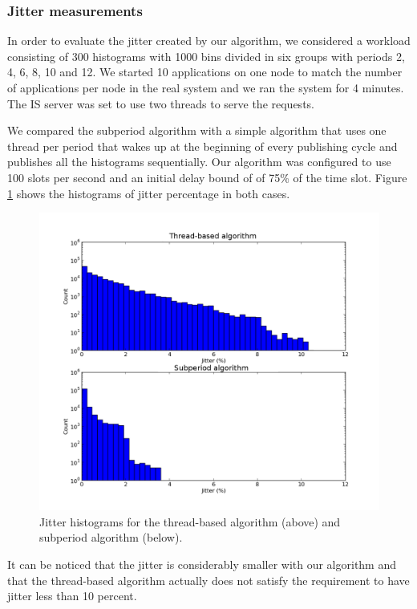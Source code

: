 \subsubsection*{Jitter measurements}

In order to evaluate the jitter created by our algorithm, we considered a workload consisting of 300 histograms with 1000 bins divided in six groups with periods 2, 4, 6, 8, 10 and 12. We started 10 applications on one node to match the number of applications per node in the real system and we ran the system for 4 minutes. The IS server was set to use two threads to serve the requests.

We compared the subperiod algorithm with a simple algorithm that uses one thread per period that wakes up at the beginning of every publishing cycle and publishes all the histograms sequentially. Our algorithm was configured to use 100 slots per second and an initial delay bound of of 75\% of the time slot. Figure \ref{fig:jitter_histo} shows the histograms of jitter percentage in both cases.

\begin{figure}[ht]
\centering
\includegraphics[scale=0.55]{Images/jitter_histo.png}
\caption[Jitter histograms.]{Jitter histograms for the thread-based algorithm (above) and subperiod algorithm (below).}
\label{fig:jitter_histo}
\end{figure}

It can be noticed that the jitter is considerably smaller with our algorithm and that the thread-based algorithm actually does not satisfy the requirement to have jitter less than 10 percent.

